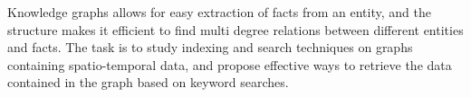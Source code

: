 Knowledge graphs allows for easy extraction of facts from an entity, and the structure makes it efficient to find multi degree relations between different entities and facts. The task is to study indexing and search techniques on graphs containing spatio-temporal data, and propose effective ways to retrieve the data contained in the graph based on keyword searches.
\\
\\

\clearpage